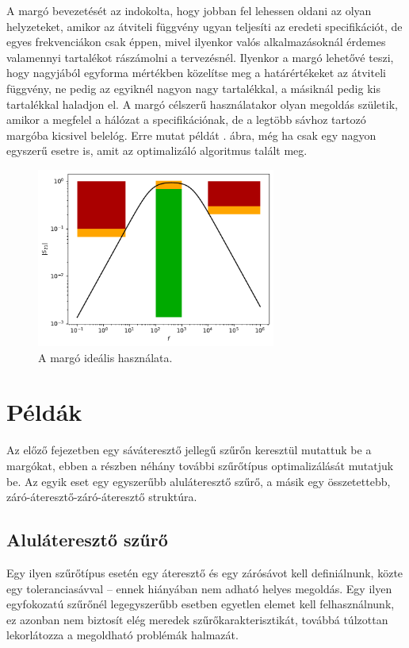         A margó bevezetését az indokolta, hogy jobban fel lehessen oldani az olyan helyzeteket, amikor az átviteli függvény ugyan teljesíti az eredeti specifikációt, de egyes frekvenciákon csak éppen, mivel ilyenkor valós alkalmazásoknál érdemes valamennyi tartalékot rászámolni a tervezésnél. Ilyenkor a margó lehetővé teszi, hogy nagyjából egyforma mértékben közelítse meg a határértékeket az átviteli függvény, ne pedig az egyiknél nagyon nagy tartalékkal, a másiknál pedig kis tartalékkal haladjon el. A margó célszerű használatakor olyan megoldás születik, amikor a megfelel a hálózat a specifikációnak, de a legtöbb sávhoz tartozó margóba kicsivel belelóg. Erre mutat példát . ábra, még ha csak egy nagyon egyszerű esetre is, amit az optimalizáló algoritmus talált meg.
        \begin{figure}[h!]
            \centering
            \includegraphics[width=0.7\textwidth]{megoldas.pdf}
            \caption{A margó ideális használata.}
            \label{fig:megoldas}
        \end{figure}

\section{Példák}

Az előző fejezetben egy sáváteresztő jellegű szűrőn keresztül mutattuk be a margókat, ebben a részben néhány további szűrőtípus optimalizálását mutatjuk be. Az egyik eset egy egyszerűbb aluláteresztő szűrő, a másik egy összetettebb, záró-áteresztő-záró-áteresztő struktúra.

	\subsection{Aluláteresztő szűrő}
		Egy ilyen szűrőtípus esetén egy áteresztő és egy zárósávot kell definiálnunk, közte egy toleranciasávval -- ennek hiányában nem adható helyes megoldás. Egy ilyen egyfokozatú szűrőnél legegyszerűbb esetben egyetlen elemet kell felhasználnunk, ez azonban nem biztosít elég meredek szűrőkarakterisztikát, továbbá túlzottan lekorlátozza a megoldható problémák halmazát.
		
